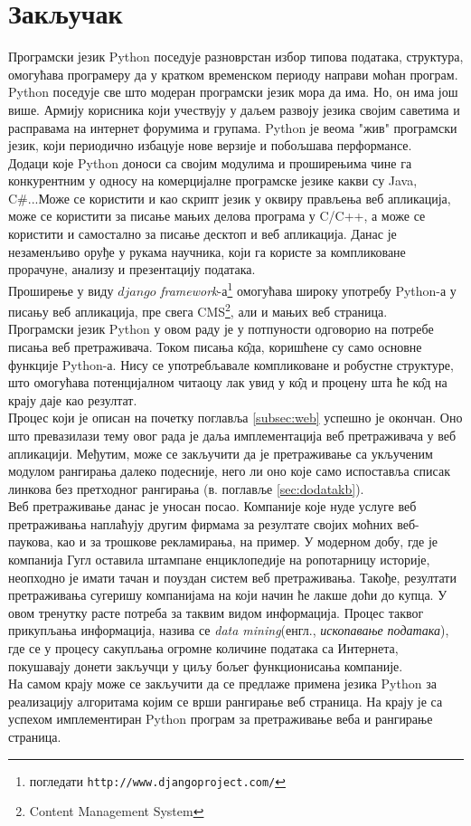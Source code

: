 \section{Закључак}
Програмски језик Python поседује разноврстан избор типова података, структура, омогућава програмеру да у кратком временском периоду направи моћан програм. Python поседује све што модеран програмски језик мора да има. Но, он има још више. Армију корисника који учествују у даљем развоју језика својим саветима и расправама на интернет форумима и групама. Python је веома "жив" програмски језик, који периодично избацује нове верзије и побољшава перформансе. \\
		Додаци које Python доноси са својим модулима и проширењима чине га конкурентним у односу на комерцијалне програмске језике какви су Java, C\#...Може се користити и као скрипт језик у оквиру прављења веб апликација, може се користити за писање мањих делова програма у C/C++, а може се користити и самостално за писање десктоп и веб апликација. Данас је незаменљиво оруђе у рукама научника, који га користе за компликоване прорачуне, анализу и презентацију података. \\
		Проширење у виду $django$ \emph{framework}-а\footnote{погледати \texttt{http://www.djangoproject.com/}} омогућава широку употребу Python-а у писању веб апликација, пре свега CMS\footnote{Content Management System}, али и мањих веб страница. \\
		Програмски језик Python у овом раду је у потпуности одговорио на потребе писања веб претраживача. Током писања к\^{о}да, коришћене су само основне функције Python-а. Нису се употребљавале компликоване и робустне структуре, што омогућава потенцијалном читаоцу лак увид у к\^{о}д и процену шта ће к\^{о}д на крају даје као резултат.\\
		Процес који је описан на почетку поглавља \ref{subsec:web} успешно је окончан. Оно што превазилази тему овог рада је даља имплементација веб претраживача у веб апликацији. Међутим, може се закључити да је претраживање са укљученим модулом рангирања далеко подесније, него ли оно које само испоставља списак линкова без претходног рангирања (в. поглавље \ref{sec:dodatakb}).  \\
		Веб претраживање данас је уносан посао. Компаније које нуде услуге веб претраживања наплаћују другим фирмама за резултате својих моћних веб-паукова, као и за трошкове рекламирања, на пример. У модерном добу, где је компанија Гугл оставила штампане енциклопедије на ропотарницу историје, неопходно је имати тачан и поуздан систем веб претраживања. Такође, резултати претраживања сугеришу компанијама на који начин ће лакше доћи до купца. У овом тренутку расте потреба за таквим видом информација. Процес таквог прикупљања информација, назива се \emph{data mining}(енгл., \emph{ископавање података}), где се у процесу сакупљања огромне количине података са Интернета, покушавају донети закључци у циљу бољег функционисања компаније.\\
		На самом крају може се закључити да се предлаже примена језика Python за реализацију алгоритама којим се врши рангирање веб страница. На крају је са успехом имплементиран Python програм за претраживање веба и рангирање страница.